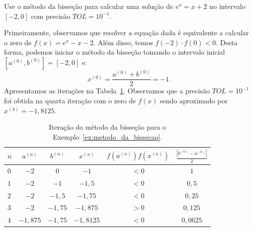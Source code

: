 \begin{ex}\label{ex:metodo_da_bissecao}Use o método da bisseção para calcular uma solução de $e^x = x + 2$ no intervalo $[-2, 0]$ com precisão $TOL = 10^{-1}$.
\end{ex}
\begin{sol}
  Primeiramente, observamos que resolver a equação dada é equivalente a calcular o zero de $f(x) = e^x - x - 2$. Além disso, temos $f(-2)\cdot f(0) < 0$. Desta forma, podemos iniciar o método da bisseção tomando o intervalo inicial $[a^{(0)}, b^{(0)}] = [-2, 0]$ e:
  \begin{equation}
    x^{(0)} = \frac{a^{(0)} + b^{(0)}}{2} = -1.
  \end{equation}
  Apresentamos as iterações na Tabela~\ref{tab:metodo_da_bissecao}. Observamos que a precisão $TOL = 10^{-1}$ foi obtida na quarta iteração com o zero de $f(x)$ sendo aproximado por $x^{(4)} = -1,8125$.
  \begin{table}
    \centering
    \caption{Iteração do método da bisseção para o Exemplo~\ref{ex:metodo_da_bissecao}.}
    \label{tab:metodo_da_bissecao}
    \begin{tabular}{l|ccc|c|c}\hline
      $n$ & $a^{(n)}$ & $b^{(n)}$ & $x^{(n)}$ & $f(a^{(n)})f(x^{(n)})$ & $\displaystyle \frac{|b^{(n)}-a^{(n)}|}{2}$\\\hline
      $0$ & $-2$ & $0$ & $-1$ & $< 0$ & $1$\\
      $1$ & $-2$ & $-1$ & $-1,5$ & $<0$ & $0,5$\\
      $2$ & $-2$ & $-1,5$ & $-1,75$ & $<0$ & $0,25$\\
      $3$ & $-2$ & $-1,75$ & $-1,875$ & $>0$ & $0,125$\\
      $4$ & $-1,875$ & $-1,75$ & $-1,8125$ & $<0$ & $0,0625$\\\hline
    \end{tabular}
  \end{table}


\end{sol}
